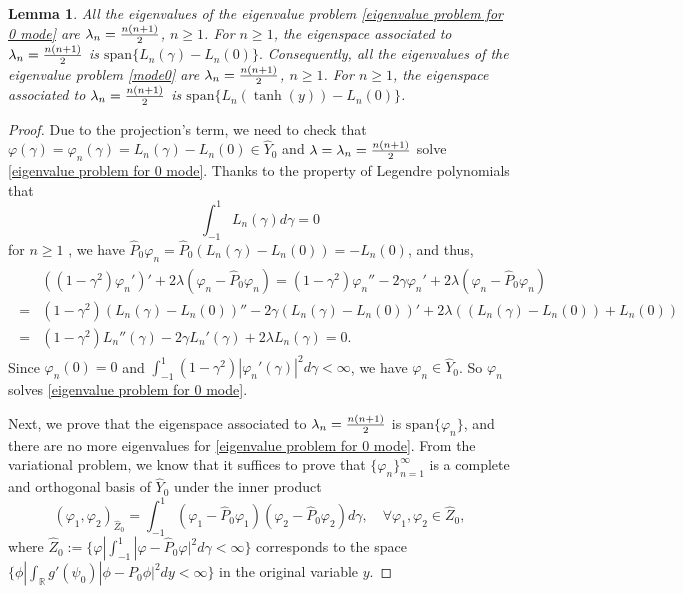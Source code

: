 \documentclass[1 [leqno, 11pt]{amsart}
\numberwithin{equation}{section}
\newtheorem{lemma}[Theorem]{Lemma}
\begin{document}
\begin{CJK*}{GBK}{song}
\begin{lemma}\label{sol to eigenvalue problem}
All the eigenvalues  of the eigenvalue problem \eqref{eigenvalue problem for 0 mode} are $\lambda_n={n(n+1)\over2}$, $n\geq1$. For $n\geq1$, the eigenspace associated to $\lambda_n={n(n+1)\over2}$ is $\text{span}\{L_{n}(\gamma)-L_{n}(0)\}.$  Consequently, all the eigenvalues  of the eigenvalue problem \eqref{mode0} are $\lambda_n={n(n+1)\over2}$, $n\geq1$. For $n\geq1$, the eigenspace associated to $\lambda_n={n(n+1)\over2}$ is $\text{span}\{L_{n}(\tanh(y))-L_{n}(0)\}$.
\end{lemma}
\begin{proof}
Due to  the projection's term, we need to  check that $\varphi(\gamma)=\varphi_n(\gamma)=L_{n}(\gamma)-L_{n}(0)\in \hat Y_0$ and $\lambda=\lambda_n={n(n+1)\over2}$  solve \eqref{eigenvalue problem for 0 mode}.
Thanks to the property of Legendre polynomials that
\begin{equation*}\label{int-0}\int_{-1}^{1} L_n(\gamma) d\gamma=0\end{equation*}
for $n\geq1$ \cite{Byerly59},
we have
 $\hat P_0\varphi_n=\hat P_0 (L_n(\gamma)-L_n(0))=-L_n(0)$,  and thus,
\begin{equation*}\begin{aligned}\begin{array}{llll}
&((1-\gamma^2)\varphi_n')'+2\lambda(\varphi_n-\hat P_0\varphi_n)=(1-\gamma^2)\varphi_n''-2\gamma\varphi_n'+2\lambda(\varphi_n-\hat P_0\varphi_n)\\
=&(1-\gamma^2)(L_n(\gamma)-L_n(0))''-2\gamma(L_n(\gamma)-L_n(0))'+2\lambda((L_n(\gamma)-L_n(0))+L_n(0))\\
=&(1-\gamma^2)L_n''(\gamma)-2\gamma L_n'(\gamma)+2\lambda L_n(\gamma)=0.
\end{array}
\end{aligned}
\end{equation*}
Since  $\varphi_n(0)=0$ and $\int_{-1}^1(1-\gamma^2)|\varphi_n'(\gamma)|^2d\gamma<\infty$, we have $\varphi_n\in \hat Y_0$.
So $\varphi_n$ solves  \eqref{eigenvalue problem for 0 mode}.

Next, we prove that the eigenspace associated to $\lambda_n={n(n+1)\over2}$ is $\text{span}\{\varphi_n\}$, and there are no more eigenvalues for \eqref{eigenvalue problem for 0 mode}. From the variational problem, we know that it suffices to prove that $\{\varphi_n\}_{n=1}^\infty$ is a complete and orthogonal basis of  $\hat Y_0$ under the inner product
$$(\varphi_1, \varphi_2)_{ \hat Z_0} = \int_{-1}^1 (\varphi_1 - \hat{P}_0\varphi_1)(\varphi_2  - \hat{P}_0 \varphi_2)  d \gamma, \quad\forall \varphi_1, \varphi_2 \in \hat Z_0,$$
where $\hat Z_0 := \{ \varphi | \int_{-1}^1 |\varphi - \hat{P}_0 \varphi|^2 d \gamma < \infty \}$ corresponds to the space $\{ \phi | \int_{\mathbb{R}} g'(\psi_0) |\phi - {P}_0 \phi|^2 d y < \infty \}$ in the original variable $y$.


\end{proof}
\end{CJK*}
\end{document}
